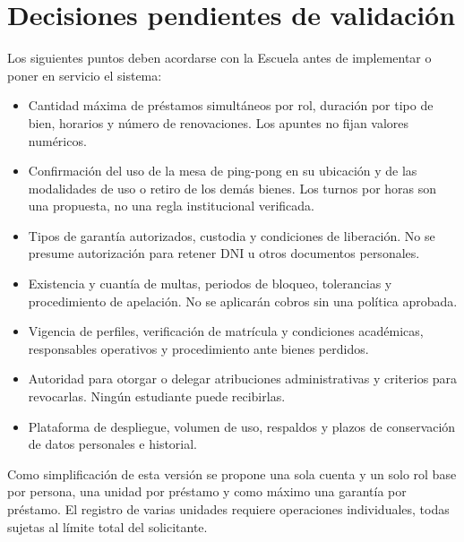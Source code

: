 \section{Decisiones pendientes de validaci\'on}
\label{sec:pendientes}

Los siguientes puntos deben acordarse con la Escuela antes de implementar o poner en servicio el sistema:

\begin{itemize}
    \item Cantidad m\'axima de pr\'estamos simult\'aneos por rol, duraci\'on por tipo de bien, horarios y n\'umero de renovaciones. Los apuntes no fijan valores num\'ericos.
    \item Confirmaci\'on del uso de la mesa de ping-pong en su ubicaci\'on y de las modalidades de uso o retiro de los dem\'as bienes. Los turnos por horas son una propuesta, no una regla institucional verificada.
    \item Tipos de garant\'ia autorizados, custodia y condiciones de liberaci\'on. No se presume autorizaci\'on para retener DNI u otros documentos personales.
    \item Existencia y cuant\'ia de multas, periodos de bloqueo, tolerancias y procedimiento de apelaci\'on. No se aplicar\'an cobros sin una pol\'itica aprobada.
    \item Vigencia de perfiles, verificaci\'on de matr\'icula y condiciones acad\'emicas, responsables operativos y procedimiento ante bienes perdidos.
    \item Autoridad para otorgar o delegar atribuciones administrativas y criterios para revocarlas. Ning\'un estudiante puede recibirlas.
    \item Plataforma de despliegue, volumen de uso, respaldos y plazos de conservaci\'on de datos personales e historial.
\end{itemize}

Como simplificaci\'on de esta versi\'on se propone una sola cuenta y un solo rol base por persona, una unidad por pr\'estamo y como m\'aximo una garant\'ia por pr\'estamo. El registro de varias unidades requiere operaciones individuales, todas sujetas al l\'imite total del solicitante.
